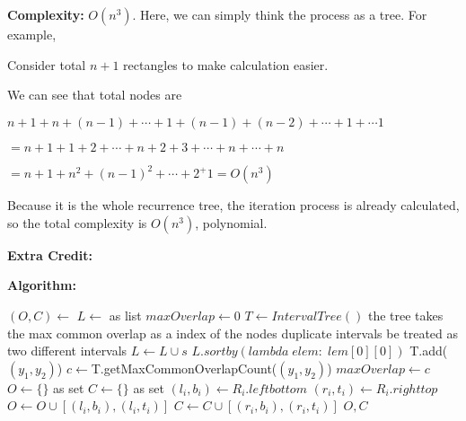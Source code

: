 \documentclass{article}
\newcommand{\Algorithm}{\textbf{Algorithm: }}
\newcommand{\Complexity}{\textbf{Complexity: }}
\begin{document}
\begin{enumerate}[topsep=0pt,parsep=1mm]
\Complexity
$O(n^3)$. Here, we can simply think the process as a tree.
For example,


Consider total $n+1$ rectangles to make calculation easier.

We can see that total nodes are 

$n+1+n+(n-1)+\cdots+1+(n-1)+(n-2)+\cdots+1+\cdots1$

$=n+1+1+2+\cdots+n+2+3+\cdots+n+\cdots+n$

$=n+1+n^2+(n-1)^2+\cdots+2^+1=O(n^3)$

Because it is the whole recurrence tree, 
the iteration process is already calculated,
so the total complexity is $O(n^3)$, polynomial.

\textbf{Extra Credit:}

\Algorithm 

\begin{algorithm}[H]
  \DontPrintSemicolon

   {
    $(O,C)\gets$
    $L\gets {}$ as list\;
    $maxOverlap\gets0$\;
    $T\gets IntervalTree()$\;
    the tree takes the max common overlap as a index of the nodes\;
    duplicate intervals be treated as two different intervals\;
     {
      $L\gets L\cup s$
    }
    $L.sortby(lambda\;elem:\;lem[0][0])$\;
     {
       {
        T.add($(y_1,y_2)$)\;
        $c\gets$T.getMaxCommonOverlapCount($(y_1,y_2)$)\;
         {
          $maxOverlap\gets c$
        }
      } 
    }
  }
   {
    $O\gets \{\}$ as set\;
    $C\gets \{\}$ as set\;
     {
      $(l_i,b_i)\gets R_i.leftbottom$\;
      $(r_i,t_i)\gets R_i.righttop$\;
      $O\gets O\cup[(l_i,b_i),(l_i,t_i)]$\;
      $C\gets C\cup[(r_i,b_i),(r_i,t_i)]$\;
    }
    \Return $O,C$
  } 
  

\end{algorithm}
\end{enumerate}
\end{document}

